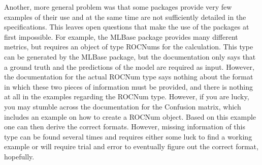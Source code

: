 Another, more general problem was that some packages provide very few examples of their use and at the same time are not sufficiently detailed in the specifications. This leaves open questions that make the use of the packages at first impossible. For example, the MLBase package provides many different metrics, but requires an object of type ROCNums for the calculation. This type can be generated by the MLBase package, but the documentation only says that a ground truth and the predictions of the model are required as input. However, the documentation for the actual ROCNum type says nothing about the format in which these two pieces of information must be provided, and there is nothing at all in the examples regarding the ROCNum type. However, if you are lucky, you may stumble across the documentation for the Confusion matrix, which includes an example on how to create a ROCNum object. Based on this example one can then derive the correct formats. However, missing information of this type can be found several times and requires either some luck to find a working example or will require trial and error to eventually figure out the correct format, hopefully.

